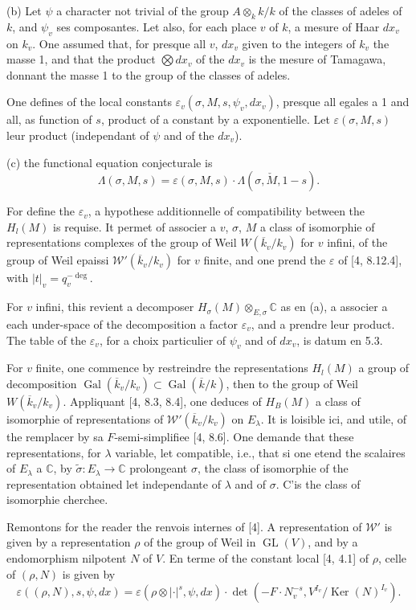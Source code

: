 \documentclass[12pt,a4paper]{article}
\theoremstyle{plain}
\theoremstyle{definition}
\theoremstyle{remark}
\DeclareMathOperator{\Gal}{Gal}
\DeclareMathOperator{\Ker}{Ker}
\DeclareMathOperator{\GL}{GL}
\newcommand{\C}{\mathbb{C}}
\begin{document}
(b) Let $\psi$ a character not trivial of the group $A \otimes_k k / k$ of the classes of adeles of
$k$, and $\psi_v$ ses composantes. Let also, for each place $v$ of $k$, a mesure of
Haar $dx_v$ on $k_v$. One assumed that, for presque all $v$, $dx_v$ given to the integers of
$k_v$ the masse 1, and that the product $\bigotimes dx_v$ of the $dx_v$ is the mesure of Tamagawa, donnant
the masse 1 to the group of the classes of adeles.

One defines of the local constants $\varepsilon_v(\sigma, M, s, \psi_v, dx_v)$, presque all egales a 1 and
all, as function of $s$, product of a constant by a exponentielle. Let
$\varepsilon(\sigma, M, s)$ leur product (independant of $\psi$ and of the $dx_v$).

(c) the functional equation conjecturale is
\[
\Lambda(\sigma, M, s) = \varepsilon(\sigma, M, s) \cdot \Lambda(\sigma, \check{M}, 1-s).
\]

For define the $\varepsilon_v$, a hypothese additionnelle of compatibility between the $H_l(M)$
is requise. It permet of associer a $v$, $\sigma$, $M$ a class of isomorphie of representations
complexes of the group of Weil $W(\overline{k}_v/k_v)$ for $v$ infini, of the group of Weil epaissi
$\mathcal{W}'(\overline{k}_v/k_v)$ for $v$ finite, and one prend the $\varepsilon$ of [4, 8.12.4], with $|t|_v = q_v^{-\deg}$.

For $v$ infini, this revient a decomposer $H_\sigma(M) \otimes_{E,\sigma} \C$ as en (a), a associer
a each under-space of the decomposition a factor $\varepsilon_v$, and a prendre leur product.
The table of the $\varepsilon_v$, for a choix particulier of $\psi_v$ and of $dx_v$, is datum en 5.3.

For $v$ finite, one commence by restreindre the representations $H_l(M)$ a group of
decomposition $\Gal(\overline{k}_v/k_v) \subset \Gal(\overline{k}/k)$, then to the group of Weil $W(\overline{k}_v/k_v)$. Appliquant
[4, 8.3, 8.4], one deduces of $H_B(M)$ a class of isomorphie of representations of
$\mathcal{W}'(\overline{k}_v/k_v)$ on $E_\lambda$. It is loisible ici, and utile, of the remplacer by sa $F$-semi-simplifiee
[4, 8.6]. One demande that these representations, for $\lambda$ variable, let compatible,
i.e., that si one etend the scalaires of $E_\lambda$ a $\C$, by $\tilde{\sigma}: E_\lambda \to \C$ prolongeant $\sigma$,
the class of isomorphie of the representation obtained let independante of $\lambda$ and of $\sigma$.
C'is the class of isomorphie cherchee.

Remontons for the reader the renvois internes of [4]. A representation of $\mathcal{W}'$
is given by a representation $\rho$ of the group of Weil in $\GL(V)$, and by a
endomorphism nilpotent $N$ of $V$. En terme of the constant local [4, 4.1] of $\rho$,
celle of $(\rho, N)$ is given by
\[
\varepsilon((\rho, N), s, \psi, dx) = \varepsilon(\rho \otimes |\cdot|^s, \psi, dx) \cdot \det(-F \cdot N_v^{-s}, V^{I_v}/\Ker(N)^{I_v}).
\]
\end{document}
